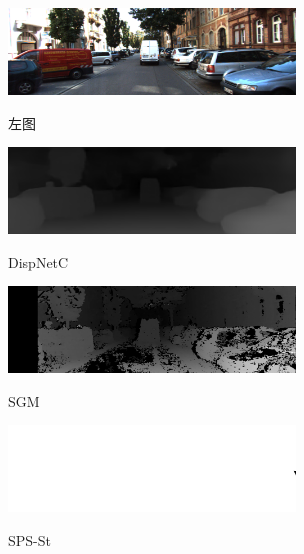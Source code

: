 \begin{figure}[!htb]
	\begin{minipage}{0.48\linewidth}
		\centerline{\includegraphics[width=3in]{figures/cmp_kitti/l_029}}
		\vspace{-10pt}
		\centerline{左图}
	\end{minipage}
	\hfill
	\begin{minipage}{0.48\linewidth}
		\centerline{\includegraphics[width=3in]{figures/cmp_kitti/pred_029}}
		\vspace{-10pt}
		\centerline{DispNetC}
	\end{minipage}
	\vfill
	\begin{minipage}{0.48\linewidth}
		\centerline{\includegraphics[width=3in]{figures/cmp_kitti/sgm_029}}
		\vspace{-10pt}
		\centerline{SGM}
	\end{minipage}
	\hfill
	\begin{minipage}{0.48\linewidth}
		\centerline{\includegraphics[width=3in]{figures/cmp_kitti/sps_029}}
		\vspace{-10pt}
		\centerline{SPS-St}
	\end{minipage}

\end{figure}

